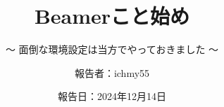 %
\title{Beamerこと始め}
\subtitle{～ 面倒な環境設定は当方でやっておきました ～}
%
%
%
\date[Dec.14th,2024]{報告日：2024年12月14日}
\author[ichmy55]{報告者：ichmy55}
\subject{Recommendation for hexahedral mesh}

